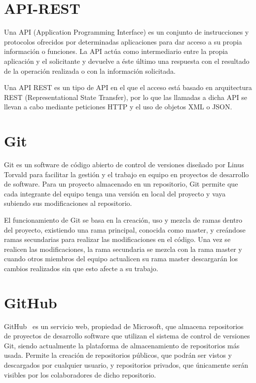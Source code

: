 \documentclass[a4paper, 12pt]{book}
\begin{document}
\section{API-REST} 
\label{sec:api}

Una API (Application Programming Interface) es un conjunto de instrucciones y protocolos ofrecidos por determinadas aplicaciones para dar acceso a su propia información o funciones. La API actúa como intermediario entre la propia aplicación y el solicitante y devuelve a éste último una respuesta con el resultado de la operación realizada o con la información solicitada.

Una API REST es un tipo de API en el que el acceso está basado en arquitectura REST (Representational State Transfer), por lo que las llamadas a dicha API se llevan a cabo mediante peticiones HTTP y el uso de objetos XML o JSON.

\section{Git} 
\label{sec:git}

Git\cite{git} es un software de código abierto de control de versiones diseñado por Linus Torvald para facilitar la gestión y el trabajo en equipo en proyectos de desarrollo de software.
Para un proyecto almacenado en un repositorio, Git permite que cada integrante del equipo tenga una versión en local del proyecto y vaya subiendo sus modificaciones al repositorio.

El funcionamiento de Git se basa en la creación, uso y mezcla de ramas dentro del proyecto, existiendo una rama principal, conocida como master, y creándose ramas secundarias para realizar las modificaciones en el código. Una vez se realicen las modificaciones, la rama secundaria se mezcla con la rama master y cuando otros miembros del equipo actualicen su rama master descargarán los cambios realizados sin que esto afecte a su trabajo.

\section{GitHub} 
\label{sec:github}

GitHub~\cite{github} es un servicio web, propiedad de Microsoft, que almacena repositorios de proyectos de desarrollo software que utilizan el sistema de control de versiones Git, siendo actualmente la plataforma de almacenamiento de repositorios más usada. Permite la creación de repositorios públicos, que podrán ser vistos y descargados por cualquier usuario, y repositorios privados, que únicamente serán visibles por los colaboradores de dicho repositorio.
\end{document}
